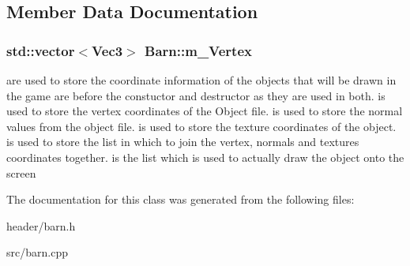 \subsection{Member Data Documentation}
\hypertarget{classBarn_adcd72002abf50a7a597dadbc27fd080f}{
\subsubsection[{m\_\-Vertex}]{\setlength{\rightskip}{0pt plus 5cm}std::vector$<${\bf Vec3}$>$ {\bf Barn::m\_\-Vertex}}}
\label{classBarn_adcd72002abf50a7a597dadbc27fd080f}
are used to store the coordinate information of the objects that will be drawn in the game  are before the constuctor and destructor as they are used in both.  is used to store the vertex coordinates of the Object file.  is used to store the normal values from the object file.  is used to store the texture coordinates of the object.  is used to store the list in which to join the vertex, normals and textures coordinates together.  is the list which is used to actually draw the object onto the screen 

The documentation for this class was generated from the following files:\begin{DoxyCompactItemize}
\item 
header/barn.h\item 
src/barn.cpp\end{DoxyCompactItemize}
